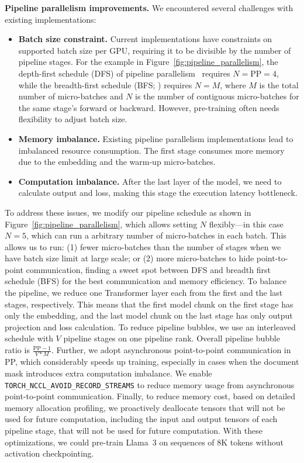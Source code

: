 \textbf{Pipeline parallelism improvements.} We encountered several challenges with existing implementations:

\begin{itemize}
    \item \textbf{Batch size constraint.} Current implementations have constraints on supported batch size per GPU, requiring it to be divisible by the number of pipeline stages. For the example in Figure~\ref{fig:pipeline_parallelism}, the depth-first schedule (DFS) of pipeline parallelism~\citep{narayanan2021efficient} requires $N=\textrm{PP}=4$, while the breadth-first schedule (BFS; \citet{lamy2023breadth}) requires $N=M$, where $M$ is the total number of micro-batches and $N$ is the number of contiguous micro-batches for the same stage's forward or backward. However, pre-training often needs flexibility to adjust batch size.

    \item \textbf{Memory imbalance.} Existing pipeline parallelism implementations lead to imbalanced resource consumption. The first stage consumes more memory due to the embedding and the warm-up micro-batches.

    \item \textbf{Computation imbalance.} After the last layer of the model, we need to calculate output and loss, making this stage the execution latency bottleneck.
\end{itemize}

 

To address these issues, we modify our pipeline schedule as shown in Figure~\ref{fig:pipeline_parallelism}, which allows setting $N$ flexibly---in this case $N=5$, which can run a arbitrary number of micro-batches in each batch. This allows us to run: (1) fewer micro-batches than the number of stages when we have batch size limit at large scale; or (2) more micro-batches to hide point-to-point communication, finding a sweet spot between DFS and breadth first schedule (BFS) for the best communication and memory efficiency. To balance the pipeline, we reduce one Transformer layer each from the first and the last stages, respectively. This means that the first model chunk on the first stage has only the embedding, and the last model chunk on the last stage has only output projection and loss calculation. To reduce pipeline bubbles, we use an interleaved schedule \citep{narayanan2021efficient} with $V$ pipeline stages on one pipeline rank. Overall pipeline bubble ratio is $\frac{\textrm{PP} - 1}{V * M}$. Further, we adopt asynchronous point-to-point communication in PP, which considerably speeds up training, especially in cases when the document mask introduces extra computation imbalance. We enable {\small \texttt{TORCH\_NCCL\_AVOID\_RECORD\_STREAMS}} to reduce memory usage from asynchronous point-to-point communication. Finally, to reduce memory cost, based on detailed memory allocation profiling, we proactively deallocate tensors that will not be used for future computation, including the input and output tensors of each pipeline stage, that will not be used for future computation. With these optimizations, we could pre-train Llama~3 on sequences of 8K tokens without activation checkpointing.

